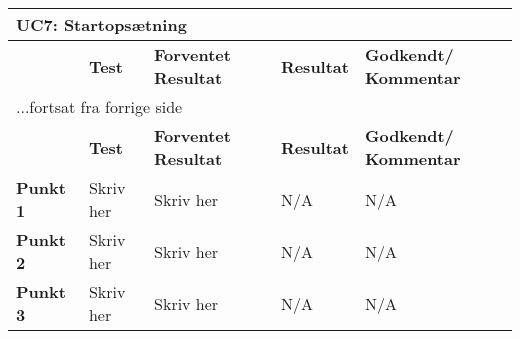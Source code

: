 
\begin{center}
\begin{longtable}{|p{}|p{}|p{3cm}|p{3cm}|p{3cm}|} %
\hline
\multicolumn{5}{|l|}{\textbf{UC7: Startopsætning}} \\ \hline
\multicolumn{1}{|c|}{} &
\textbf{Test} &
\textbf{Forventet \newline Resultat} &
\textbf{Resultat} &
\textbf{Godkendt/ \newline Kommentar} \\ \hline 
\endfirsthead

\multicolumn{5}{l}{...fortsat fra forrige side} \\ \hline 
\multicolumn{1}{|c|}{} &
\textbf{Test} &
\textbf{Forventet \newline Resultat} &
\textbf{Resultat} &
\textbf{Godkendt/ \newline Kommentar} \\ \hline 
\endhead


\textbf{Punkt 1} &
Skriv her &
Skriv her &
N/A &
N/A \\\hline

\textbf{Punkt 2} &
Skriv her &
Skriv her &
N/A &
N/A \\\hline

\textbf{Punkt 3} &
Skriv her &
Skriv her &
N/A &
N/A \\\hline

	\end{longtable}
	\label{ATUC7} 
\end{center}